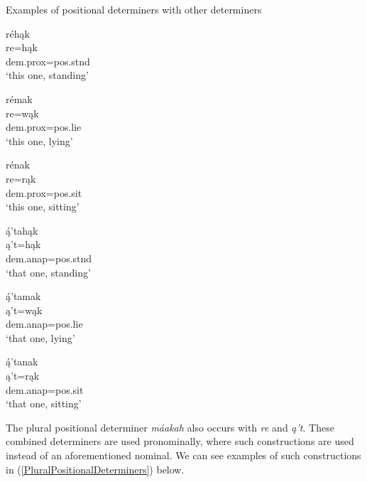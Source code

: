 \begin{exe}
    \item\label{PositionalsWithDeterminers} Examples of positional determiners with other determiners

    \begin{xlist}

        \item\label{PositionalsWithDeterminersA} \glll réhąk\\
            re=hąk\\
            dem.prox=pos.stnd\\
            \glt `this one, standing'
        \item\label{PositionalsWithDeterminersB} \glll rémak\\
            re=wąk\\
            dem.prox=pos.lie\\
            \glt `this one, lying'
        \item\label{PositionalsWithDeterminersC} \glll rénak\\
            re=rąk\\
            dem.prox=pos.sit\\
            \glt `this one, sitting'
        \item\label{PositionalsWithDeterminersD} \glll ą́'tahąk\\
        ą't=hąk\\
        dem.anap=pos.stnd\\
        \glt `that one, standing'
        \item\label{PositionalsWithDeterminersE} \glll ą́'tamak\\
        ą't=wąk\\
        dem.anap=pos.lie\\
        \glt `that one, lying'
        \item\label{PositionalsWithDeterminersF} \glll ą́'tanak\\
        ą't=rąk\\
        dem.anap=pos.sit\\
        \glt `that one, sitting'
        
    \end{xlist}
    
\end{exe}

The plural positional determiner \textit{máakah} also occurs with \textit{re} and \textit{ą't}. These combined determiners are used pronominally, where such constructions are used instead of an aforementioned nominal. We can see examples of such constructions in (\ref{PluralPositionalDeterminers}) below.

